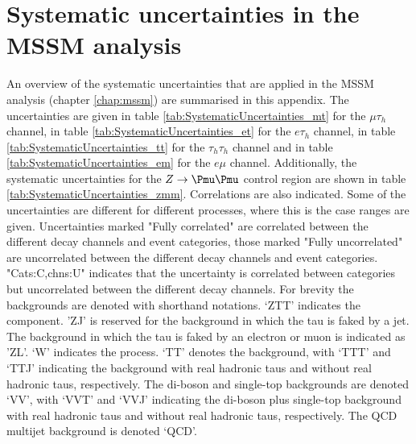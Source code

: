 \appendix
\renewcommand{\chaptername}{Appendix}
\chapter{\texorpdfstring{Systematic uncertainties in the MSSM \AHtotautau analysis}{Overview of systematic uncertainties in the MSSM A/H to tautau analysis}}
\label{appendix:uncerts}
An overview of the systematic uncertainties that are applied in the MSSM \AHtotautau analysis (chapter \ref{chap:mssm})
are summarised in this appendix. The uncertainties are given in
table \ref{tab:SystematicUncertainties_mt} for the $\mu\tau_h$
channel, in table \ref{tab:SystematicUncertainties_et} for the $e\tau_h$ channel,
in table \ref{tab:SystematicUncertainties_tt} for the $\tau_h\tau_h$ channel and
in table \ref{tab:SystematicUncertainties_em} for the $e\mu$ channel. Additionally,
the systematic uncertainties for the $Z\rightarrow\mumu$ control region are shown
in table \ref{tab:SystematicUncertainties_zmm}. Correlations are also indicated.
Some of the uncertainties
are different for different processes, where this is the case ranges are given.
Uncertainties marked "Fully correlated" are correlated between the different
decay channels and event categories, those marked "Fully uncorrelated" are
uncorrelated between the different decay channels and event categories. "Cats:C,chns:U"
indicates that the uncertainty is correlated between categories but uncorrelated between
the different decay channels. For brevity the backgrounds are denoted with shorthand notations.
`ZTT' indicates the \Ztautau component. 'ZJ' is reserved for the \Zellell background
in which the tau is faked by a jet. The \Zellell background in which the tau is faked
by an electron or muon is indicated as 'ZL'. `W' indicates the \Wjets process. `TT' denotes
the \ttbar background, with  `TTT' and `TTJ'
indicating the \ttbar background with real hadronic taus and without real hadronic taus, respectively. 
The di-boson and single-top backgrounds are denoted `VV', with
`VVT' and `VVJ' indicating the di-boson plus single-top background with real hadronic taus
and without real hadronic taus, respectively. The QCD multijet background is denoted `QCD'.




